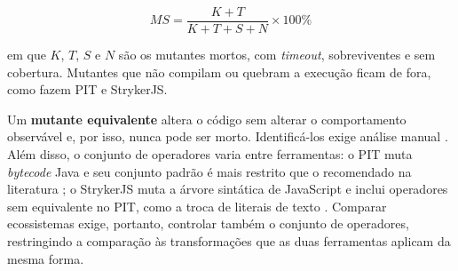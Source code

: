 \begin{equation}
MS = \frac{K + T}{K + T + S + N} \times 100\%
\label{eq:ms}
\end{equation}

\noindent em que $K$, $T$, $S$ e $N$ são os mutantes mortos, com \textit{timeout}, sobreviventes e sem cobertura. Mutantes que não compilam ou quebram a execução ficam de fora, como fazem PIT e StrykerJS.

Um \textbf{mutante equivalente} altera o código sem alterar o comportamento observável e, por isso, nunca pode ser morto. Identificá-los exige análise manual \citep{papadakis2019mutation}. Além disso, o conjunto de operadores varia entre ferramentas: o PIT muta \textit{bytecode} Java \citep{coles2016pit} e seu conjunto padrão é mais restrito que o recomendado na literatura \citep{laurent2017pit}; o StrykerJS muta a árvore sintática de JavaScript e inclui operadores sem equivalente no PIT, como a troca de literais de texto \citep{stryker2026}. Comparar ecossistemas exige, portanto, controlar também o conjunto de operadores, restringindo a comparação às transformações que as duas ferramentas aplicam da mesma forma.
